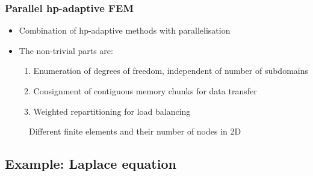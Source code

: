 \begin{frame}
\frametitle{Parallel hp-adaptive FEM}

\begin{itemize}
\item Combination of hp-adaptive methods with parallelisation
\end{itemize}

\vfill{}

\begin{itemize}
\item The non-trivial parts are:
  \begin{enumerate}
  \item Enumeration of degrees of freedom, independent of number of subdomains
  \item Consignment of contiguous memory chunks for data transfer
  \item Weighted repartitioning for load balancing
  \end{enumerate}
\end{itemize}

\vfill{}

\begin{figure}
\caption{Different finite elements and their number of nodes in 2D}
\end{figure}
\end{frame}





\subsection{Example: Laplace equation}





